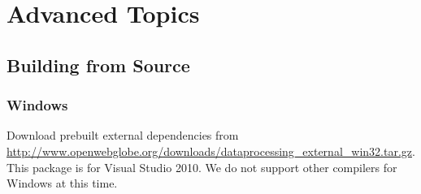 \documentclass[
	12pt,
	a4paper,
	english,	
	appendixprefix,				     			        
	openany,		     	
	abstracton,		    		    
 	BCOR8mm,		    
]{scrartcl}
\newcommand{\bildhalf}[2]{\begin{figure}[H]
      \centering
      \noindent{\texttt{[image: \#1]}}\caption{#2}
\end{figure}}
\begin{document}

%
%
%
%
%



\section{Advanced Topics}



\subsection{Building from Source}

\subsubsection{Windows}

Download prebuilt external dependencies from \url{http://www.openwebglobe.org/downloads/dataprocessing_external_win32.tar.gz}.
This package is for Visual Studio 2010. We do not support other compilers for Windows at this time.
\end{document}
